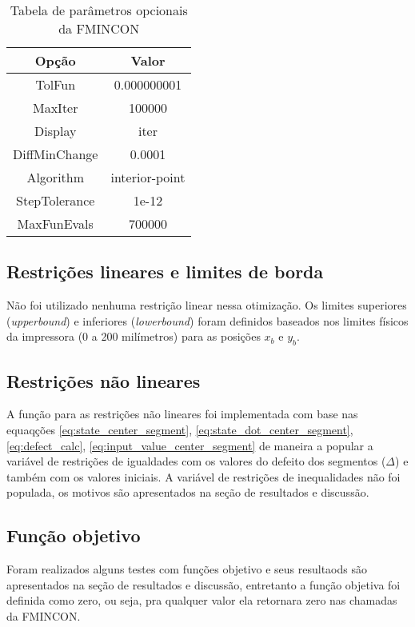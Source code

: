 \begin{table}
    \begin{center}
    \caption{Tabela de parâmetros opcionais da FMINCON}
    \label{tab:fmincon_options}
    \begin{tabular}{c c}
        Opção & Valor \\ \hline
        TolFun & 0.000000001 \\
        MaxIter & 100000 \\
        Display & iter \\
        DiffMinChange & 0.0001 \\
        Algorithm & interior-point \\
        StepTolerance & 1e-12 \\
        MaxFunEvals & 700000  \\ \hline
    \end{tabular}
    \end{center}
\end{table}

\subsection{Restrições lineares e limites de borda}
Não foi utilizado nenhuma restrição linear nessa otimização.
Os limites superiores (\textit{upperbound}) e inferiores (\textit{lowerbound}) foram definidos
baseados nos limites físicos da impressora (0 a 200 milímetros) para as posições $x_b$ e $y_b$.

\subsection{Restrições não lineares}
A função para as restrições não lineares foi implementada com base nas equaqções \ref{eq:state_center_segment},
\ref{eq:state_dot_center_segment}, \ref{eq:defect_calc}, \ref{eq:input_value_center_segment} de maneira a
popular a variável de restrições de igualdades com os valores do defeito dos segmentos ($\Delta$) e também
com os valores iniciais. A variável de restrições de inequalidades não foi populada, os motivos são apresentados
na seção de resultados e discussão.

\subsection{Função objetivo}
Foram realizados alguns testes com funções objetivo e seus resultaods são apresentados na seção de resultados e discussão,
entretanto a função objetiva foi definida como zero, ou seja, pra qualquer valor ela retornara zero nas chamadas da FMINCON.

